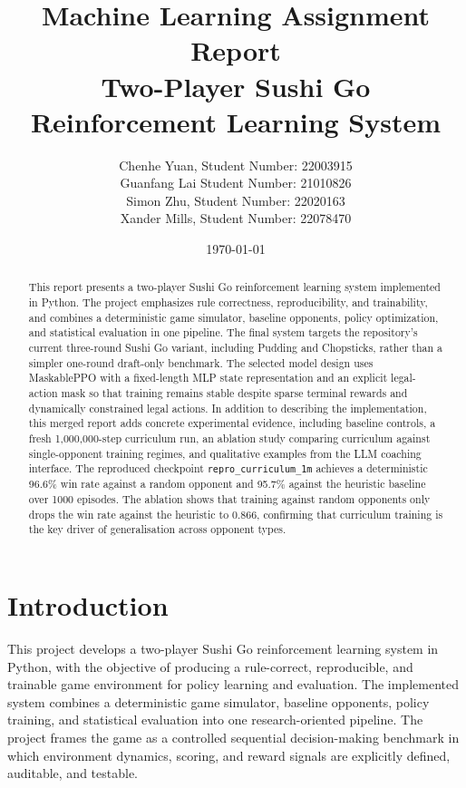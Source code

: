 \documentclass[10pt]{article}
\begin{document}
\title{Machine Learning Assignment Report\\
\large Two-Player Sushi Go Reinforcement Learning System}
\author{Chenhe Yuan, Student Number: 22003915 \\ Guanfang Lai Student Number: 21010826\\ Simon Zhu, Student Number: 22020163 \\ Xander Mills, Student Number: 22078470}
\date{\today}
\maketitle

\begin{abstract}
This report presents a two-player Sushi Go reinforcement learning system implemented in Python. The project emphasizes rule correctness, reproducibility, and trainability, and combines a deterministic game simulator, baseline opponents, policy optimization, and statistical evaluation in one pipeline. The final system targets the repository's current three-round Sushi Go variant, including Pudding and Chopsticks, rather than a simpler one-round draft-only benchmark. The selected model design uses MaskablePPO with a fixed-length MLP state representation and an explicit legal-action mask so that training remains stable despite sparse terminal rewards and dynamically constrained legal actions. In addition to describing the implementation, this merged report adds concrete experimental evidence, including baseline controls, a fresh 1,000,000-step curriculum run, an ablation study comparing curriculum against single-opponent training regimes, and qualitative examples from the LLM coaching interface. The reproduced checkpoint \texttt{repro\_curriculum\_1m} achieves a deterministic 96.6\% win rate against a random opponent and 95.7\% against the heuristic baseline over 1000 episodes. The ablation shows that training against random opponents only drops the win rate against the heuristic to 0.866, confirming that curriculum training is the key driver of generalisation across opponent types.
\end{abstract}

\section{Introduction}

This project develops a two-player Sushi Go reinforcement learning system in Python, with the objective of producing a rule-correct, reproducible, and trainable game environment for policy learning and evaluation. The implemented system combines a deterministic game simulator, baseline opponents, policy training, and statistical evaluation into one research-oriented pipeline. The project frames the game as a controlled sequential decision-making benchmark in which environment dynamics, scoring, and reward signals are explicitly defined, auditable, and testable.
\end{document}
